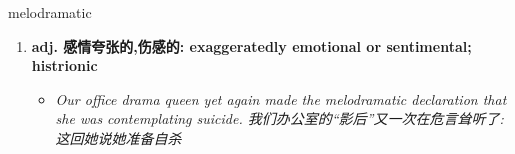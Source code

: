 
\begin{frame}
{\huge melodramatic}
\begin{center}
\begin{enumerate}\Large
  \item \textbf{adj. 感情夸张的,伤感的: exaggeratedly emotional or sentimental; histrionic}
  \begin{itemize}
    \item \em{\Large{Our office drama queen yet again made the melodramatic declaration that she was contemplating suicide. 我们办公室的“影后”又一次在危言耸听了:这回她说她准备自杀}}
  \end{itemize}
\end{enumerate}
\end{center}
\end{frame}
